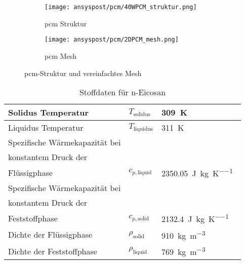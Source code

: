 \begin{figure}[!htb]
    \centering
    \begin{subfigure}[t]{0.7\textwidth}
        \centering
        \texttt{[image: ansyspost/pcm/40WPCM\_struktur.png]}
        \caption{\ac{pcm} Struktur}\label{fig:pcm_struktur}
    \end{subfigure}
    \hfill
    \begin{subfigure}[t]{0.15\textwidth}
        \centering
        \texttt{[image: ansyspost/pcm/2DPCM\_mesh.png]}
        \caption{\ac{pcm} Mesh}\label{fig:pcm_mesh}
    \end{subfigure}
    \caption{\ac{pcm}-Struktur und vereinfachtes Mesh}\label{fig:pcm_geometrien}
\end{figure}

\begin{table}[H]

  \centering
  \caption{Stoffdaten für n-Eicosan}\label{tab:eicosane_data}

  \begin{tabular}{lll}

    \toprule[1pt]
    Solidus Temperatur & $T_{\text{solidus}}$ & \SI{309}{\kelvin}~\cite{NIST} \\

    \midrule[0.5pt]
    Liquidus Temperatur & $T_{\text{liquidus}}$ & \SI{311}{\kelvin}~\cite{NIST} \\

    \midrule[0.5pt]
    Spezifische Wärmekapazität bei\\konstantem Druck der\\Flüssigphase & $c_{p,\text{liquid}}$ & \SI{2350.05}{\joule\per\kilogram\per\kelvin}~\cite{NIST} \\

    \midrule[0.5pt]
    Spezifische Wärmekapazität bei\\konstantem Druck der\\Feststoffphase & $c_{p,\text{solid}}$ & \SI{2132.4}{\joule\per\kilogram\per\kelvin}~\cite{NIST} \\

    \midrule[0.5pt]
    Dichte der Flüssigphase & $\rho_{\text{solid}}$ & \SI{910}{\kilogram\per\cubic\meter}~\cite{Nazarychev-2022} \\

    \midrule[0.5pt]
    Dichte der Feststoffphase & $\rho_{\text{liquid}}$ & \SI{769}{\kilogram\per\cubic\meter}~\cite{Nazarychev-2022} \\


\end{tabular}
\end{table}

